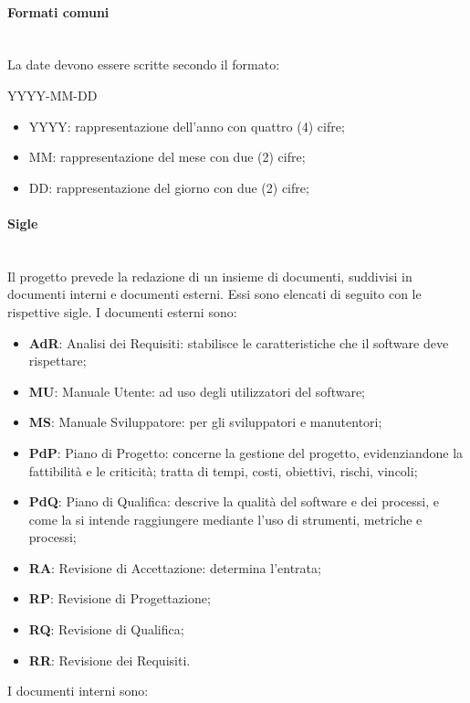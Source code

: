 		\paragraph{Formati comuni} \mbox{}\\
		La date devono essere scritte secondo il formato: \newline
		\centerline{YYYY-MM-DD}
		\begin{itemize}
			\item YYYY: rappresentazione dell'anno con quattro (4) cifre;
			\item MM: rappresentazione del mese con due (2) cifre;
			\item DD: rappresentazione del giorno con due (2) cifre;			
		\end{itemize}
		\paragraph{Sigle} \mbox{}\\
		Il progetto prevede la redazione di un insieme di documenti, suddivisi in documenti interni e documenti esterni. Essi sono elencati di seguito con le rispettive sigle.\newline
		I documenti esterni sono:		
		\begin{itemize}
			\item \textbf{AdR}: Analisi dei Requisiti: stabilisce le caratteristiche che il software deve rispettare;
			\item \textbf{MU}: Manuale Utente: ad uso degli utilizzatori del software;
			\item \textbf{MS}: Manuale Sviluppatore: per gli sviluppatori e manutentori;
			\item \textbf{PdP}: Piano di Progetto: concerne la gestione del progetto, evidenziandone la fattibilità e le criticità; tratta di tempi, costi, obiettivi, rischi, vincoli;
			\item \textbf{PdQ}: Piano di Qualifica: descrive la qualità del software e dei processi, e come la si intende raggiungere mediante l'uso di strumenti, metriche e processi;
			\item \textbf{RA}: Revisione di Accettazione: determina l'entrata;
			\item \textbf{RP}: Revisione di Progettazione;
			\item \textbf{RQ}: Revisione di Qualifica;
			\item \textbf{RR}: Revisione dei Requisiti.
		\end{itemize}	
		I documenti interni sono:
